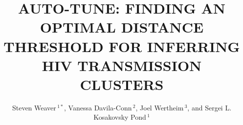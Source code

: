 \documentclass[utf8]{FrontiersinHarvard} %
\def\firstAuthorLast{Weaver {et~al.}} %
\def\Authors{Steven Weaver\,$^{1*}$, Vanessa Davila-Conn\,$^{2}$, Joel Wertheim\,$^{3}$, and Sergei L. Kosakovsky Pond\,$^{1}$}
\begin{document}
\onecolumn
{}

\title { AUTO-TUNE: FINDING AN OPTIMAL DISTANCE THRESHOLD FOR INFERRING HIV TRANSMISSION CLUSTERS } 

\author[\firstAuthorLast ]{\Authors} %
\address{} %
\correspondance{} %

\extraAuth{}%


\maketitle
\end{document}
